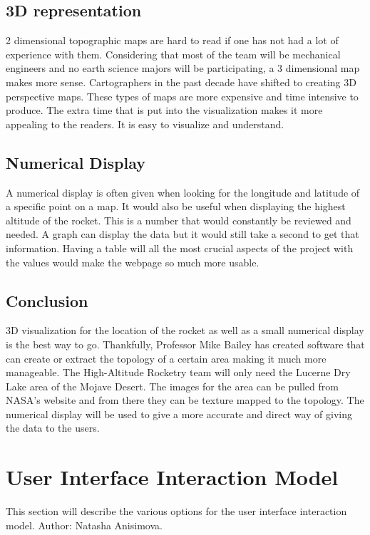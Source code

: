 \documentclass[10pt,draftclsnofoot,onecolumn]{IEEEtran}
\begin{document}
	\subsection{3D representation}
	2 dimensional topographic maps are hard to read if one has not had a lot of experience with them. 
	Considering that most of the team will be mechanical engineers and no earth science majors will be participating, a 
	3 dimensional map makes more sense. 
	Cartographers in the past decade have shifted to creating 3D perspective maps. 
	These types of maps are more expensive and time intensive to produce. 
	The extra time that is put into the visualization makes it more appealing to the readers. 
	It is easy to visualize and understand.
	
	\subsection{Numerical Display}
	A numerical display is often given when looking for the longitude and latitude of a specific point on a map. 
	It would also be useful when displaying the highest altitude of the rocket. 
	This is a number that would constantly be reviewed and needed. 
	A graph can display the data but it would still take a second to get that information. 
	Having a table will all the most crucial aspects of the project with the values would make the webpage so much more usable.
	
	\subsection{Conclusion}
	3D visualization for the location of the rocket as well as a small numerical display is the best way to go. 
	Thankfully, Professor Mike Bailey has created software that can create or extract the topology of a certain area 
	making it much more manageable. 
	The High-Altitude Rocketry team will only need the Lucerne Dry Lake area of the Mojave Desert. 
	The images for the area can be pulled from NASA’s website and from there they can be texture mapped to the topology. 
	The numerical display will be used to give a more accurate and direct way of giving the data to the users. 
	
	\section{User Interface Interaction Model}
	This section will describe the various options for the user interface interaction model. Author: Natasha Anisimova.
	
\end{document}
